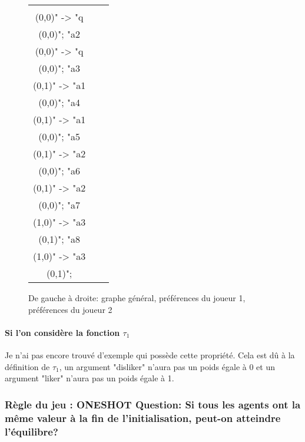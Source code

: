 \documentclass[12pt]{article}
\theoremstyle{defi}
\theoremstyle{not}
\theoremstyle{prob}
\begin{document}
\begin{figure}
\begin{tabular}{ccc}
              \begin{tikzpicture}[>=stealth]
              \graph [ layered layout, nodes = {scale=0.75, align=center} ] {
              "a1\\ (0,0)" -> "q\\ (0,0)";
              "a2\\ (0,0)" -> "q\\ (0,0)";
              "a3\\ (0,1)" -> "a1\\ (0,0)";
              "a4\\ (0,1)" -> "a1\\ (0,0)";
              "a5\\ (0,1)" -> "a2\\ (0,0)";
              "a6\\ (0,1)" -> "a2\\ (0,0)";
              "a7\\ (1,0)" -> "a3\\ (0,1)";
              "a8\\ (1,0)" -> "a3\\ (0,1)";
              };
              \end{tikzpicture} \\
            \end{tabular}

            \caption{De gauche à droite: graphe général, préférences du joueur 1, préférences du joueur 2}
            \label{fig:dif_pref}
          \end{figure}

        \paragraph{Si l'on considère la fonction $\tau_1$\\}
          Je n'ai pas encore trouvé d'exemple qui possède cette propriété.
          Cela est dû à la définition de $\tau_1$, un argument "disliker" n'aura pas un poids égale à 0 et un argument "liker" n'aura pas un poids égale à 1.

      \subsubsection{Règle du jeu : ONESHOT Question: Si tous les agents ont la même valeur à la fin de l'initialisation, peut-on atteindre l'équilibre?}
\end{document}
